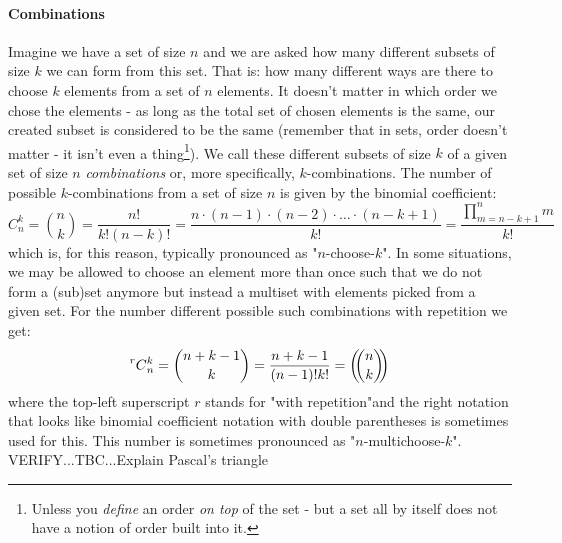 


\paragraph{Combinations}
Imagine we have a set of size $n$ and we are asked how many different subsets of size $k$ we can form from this set. That is: how many different ways are there to choose $k$ elements from a set of $n$ elements. It doesn't matter in which order we chose the elements - as long as the total set of chosen elements is the same, our created subset is considered to be the same (remember that in sets, order doesn't matter - it isn't even a thing\footnote{Unless you \emph{define} an order \emph{on top} of the set - but a set all by itself does not have a notion of order built into it.}). We call these different subsets of size $k$ of a given set of size $n$ \emph{combinations} or, more specifically, $k$-combinations. The number of possible $k$-combinations from a set of size $n$ is given by the binomial coefficient:
\begin{equation}
C_n^k = \binom{n}{k} 
      = \frac{n!}{k! (n-k)!} 
      = \frac{n \cdot (n-1) \cdot (n-2) \cdot \ldots \cdot (n-k+1)}{k!}
      = \frac{\prod_{m=n-k+1}^{n} m}{k!}
\end{equation}
which is, for this reason, typically pronounced as "$n$-choose-$k$". In some situations, we may be allowed to choose an element more than once such that we do not form a (sub)set anymore but instead a multiset with elements picked from a given set. For the number different possible such combinations with repetition we get:
\begin{equation}
\prescript{r}{}{C}_n^k
= \binom{n+k-1}{k}
= \frac{n+k-1}{(n-1)! k!}
= \left(\!\!{n\choose k}\!\!\right)
\end{equation}
where the top-left superscript $r$ stands for "with repetition"and the right notation that looks like binomial coefficient notation with double parentheses is sometimes used for this. This number is sometimes pronounced as "$n$-multichoose-$k$". VERIFY...TBC...Explain Pascal's triangle


